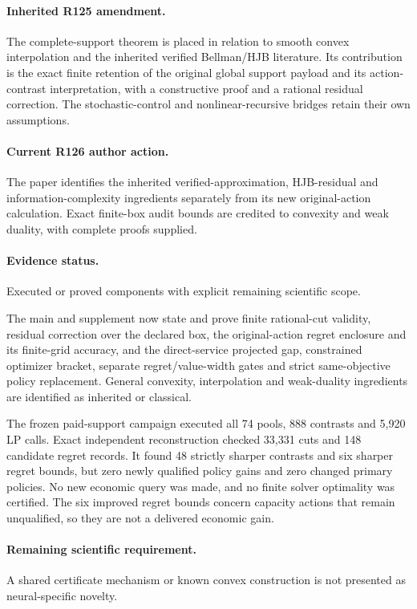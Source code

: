 \paragraph{Inherited R125 amendment.} The complete-support theorem is placed in relation to smooth convex interpolation and the inherited verified Bellman/HJB literature. Its contribution is the exact finite retention of the original global support payload and its action-contrast interpretation, with a constructive proof and a rational residual correction. The stochastic-control and nonlinear-recursive bridges retain their own assumptions.

\paragraph{Current R126 author action.} The paper identifies the inherited verified-approximation, HJB-residual and information-complexity ingredients separately from its new original-action calculation. Exact finite-box audit bounds are credited to convexity and weak duality, with complete proofs supplied.

\paragraph{Evidence status.} Executed or proved components with explicit remaining scientific scope.

The main and supplement now state and prove finite rational-cut validity, residual correction over the declared box, the original-action regret enclosure and its finite-grid accuracy, and the direct-service projected gap, constrained optimizer bracket, separate regret/value-width gates and strict same-objective policy replacement. General convexity, interpolation and weak-duality ingredients are identified as inherited or classical.\par
The frozen paid-support campaign executed all 74 pools, 888 contrasts and 5,920 LP calls. Exact independent reconstruction checked 33,331 cuts and 148 candidate regret records. It found 48 strictly sharper contrasts and six sharper regret bounds, but zero newly qualified policy gains and zero changed primary policies. No new economic query was made, and no finite solver optimality was certified. The six improved regret bounds concern capacity actions that remain unqualified, so they are not a delivered economic gain.\par

\paragraph{Remaining scientific requirement.} A shared certificate mechanism or known convex construction is not presented as neural-specific novelty.

